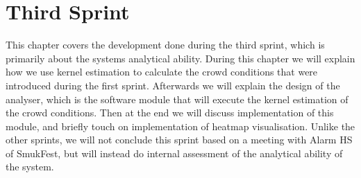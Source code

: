 \chapter{Third Sprint}\label{ch:sprint3}

This chapter covers the development done during the third sprint, which is primarily about the systems analytical ability. During this chapter we will explain how we use kernel estimation to calculate the crowd conditions that were introduced during the first sprint. Afterwards we will explain the design of the analyser, which is the software module that will execute the kernel estimation of the crowd conditions. Then at the end we will discuss implementation of this module, and briefly touch on implementation of heatmap visualisation. Unlike the other sprints, we will not conclude this sprint based on a meeting with Alarm HS of SmukFest, but will instead do internal assessment of the analytical ability of the system.









